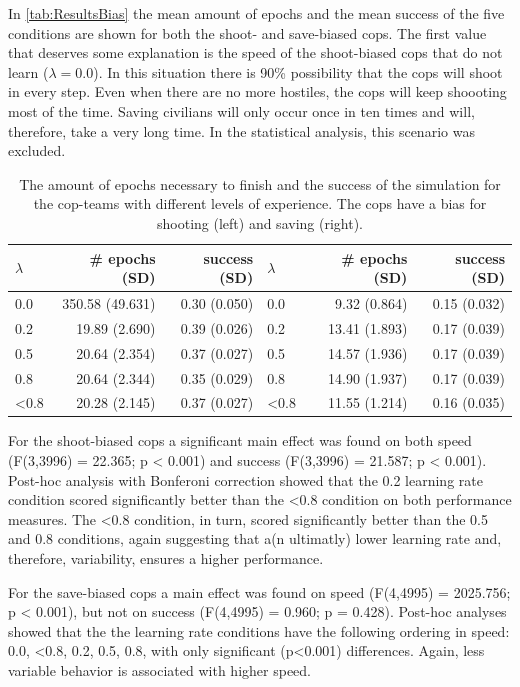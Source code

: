 In \autoref{tab:ResultsBias} the mean amount of epochs and the mean success of the five conditions are shown for both the shoot- and save-biased cops. The first value that deserves some explanation is the speed of the shoot-biased cops that do not learn ($\lambda = 0.0$). In this situation there is 90\% possibility that the cops will shoot in every step. Even when there are no more hostiles, the cops will keep shoooting most of the time. Saving civilians will only occur once in ten times and will, therefore, take a very long time. In the statistical analysis, this scenario was excluded. 
\begin{table}
\begin{center}
\begin{tabular}{l r  r | l r  r}
$\lambda$ &  \# epochs (SD) & success (SD) & $\lambda$ &  \# epochs (SD) & success (SD)\\
\hline
0.0 & 350.58 (49.631) & 0.30 (0.050) & 0.0 & 9.32 (0.864) & 0.15 (0.032)\\
0.2 & 19.89 (2.690) & 0.39 (0.026) & 0.2 & 13.41 (1.893) & 0.17 (0.039)\\
0.5 & 20.64 (2.354) & 0.37 (0.027) & 0.5 & 14.57 (1.936) & 0.17 (0.039)\\
0.8 & 20.64 (2.344) & 0.35 (0.029) & 0.8 & 14.90 (1.937) & 0.17 (0.039)\\
<0.8 & 20.28 (2.145) & 0.37 (0.027) & <0.8 & 11.55 (1.214) & 0.16 (0.035)\\
\hline
\end{tabular}
\caption{The amount of epochs necessary to finish and the success of the simulation for the cop-teams with different levels of experience. The cops have a bias for shooting (left) and saving (right).}
\label{tab:ResultsBias}
\end{center}
\end{table}
For the shoot-biased cops a significant main effect was found on both speed (F(3,3996) = 22.365; p < 0.001) and success (F(3,3996) = 21.587; p < 0.001). Post-hoc analysis with Bonferoni correction showed that the 0.2 learning rate condition scored significantly better than the <0.8 condition on both performance measures. The <0.8 condition, in turn, scored significantly better than the 0.5 and 0.8 conditions, again suggesting that a(n ultimatly) lower learning rate and, therefore, variability, ensures a higher performance. 

For the save-biased cops a main effect was found on speed (F(4,4995) = 2025.756; p < 0.001), but not on success (F(4,4995) = 0.960; p = 0.428). Post-hoc analyses showed that the the learning rate conditions have the following ordering in speed: 0.0, <0.8, 0.2, 0.5, 0.8, with only significant (p<0.001) differences. Again, less variable behavior is associated with higher speed.

